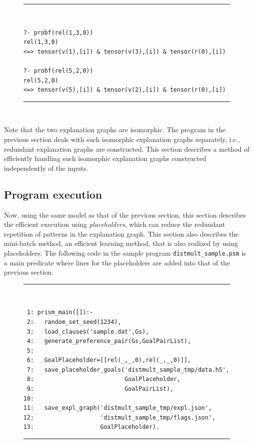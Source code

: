 \documentclass[a4paper]{report}
\begin{document}
\begin{figure}[h]
	\rule{0.85\textwidth}{0.10mm}\\ [-1em]
	\begin{verbatim}
?- probf(rel(1,3,0))
rel(1,3,0)
<=> tensor(v(1),[i]) & tensor(v(3),[i]) & tensor(r(0),[i])

?- probf(rel(5,2,0))
rel(5,2,0)
<=> tensor(v(5),[i]) & tensor(v(2),[i]) & tensor(r(0),[i])
\end{verbatim}
\rule{0.85\textwidth}{0.10mm}\\ [-1em]
\end{figure}

Note that the two explanation graphs are isomorphic.
The program in the previous section deals with such isomorphic explanation graphs separately, i.e., redundant explanation graphs are constructed.
This section describes a method of efficiently handling such isomorphic explanation graphs constructed independently of the inputs.


\subsection*{Program execution}

Now, using the same model as that of the previous section, this section describes the efficient execution using {\it placeholders}, which can reduce the redundant repetition of patterns in the explanation graph.
This section also describes the mini-batch method, an efficient learning method, that is also realized by using placeholders.
The following code in the sample program {\tt distmult\_sample.psm} is a main predicate where lines for the placeholders are added into that of the previous section.

\begin{figure}[h]
	\rule{0.85\textwidth}{0.10mm}\\ [-1em]
\begin{verbatim}
 1: prism_main([]):-
 2:   random_set_seed(1234),
 3:   load_clauses('sample.dat',Gs),
 4:   generate_preference_pair(Gs,GoalPairList),
 5:
 6:   GoalPlaceholder=[[rel(_,_,0),rel(_,_,0)]],
 7:   save_placeholder_goals('distmult_sample_tmp/data.h5',
 8:                          GoalPlaceholder,
 9:                          GoalPairList),
10: 
11:   save_expl_graph('distmult_sample_tmp/expl.json',
12:                   'distmult_sample_tmp/flags.json',
13:                   GoalPlaceholder).
\end{verbatim}
\rule{0.85\textwidth}{0.10mm}\\ [-1em]
\end{figure}
\end{document}
